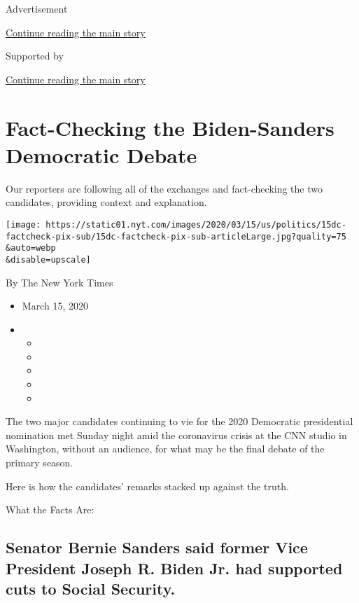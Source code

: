Advertisement

\protect\hyperlink{after-top}{Continue reading the main story}

Supported by

\protect\hyperlink{after-sponsor}{Continue reading the main story}

\hypertarget{fact-checking-the-biden-sanders-democratic-debate}{%
\section{Fact-Checking the Biden-Sanders Democratic
Debate}\label{fact-checking-the-biden-sanders-democratic-debate}}

Our reporters are following all of the exchanges and fact-checking the
two candidates, providing context and explanation.

\texttt{[image: https://static01.nyt.com/images/2020/03/15/us/politics/15dc-factcheck-pix-sub/15dc-factcheck-pix-sub-articleLarge.jpg?quality=75\\\&auto=webp\\\&disable=upscale]}

By The New York Times

\begin{itemize}
\item
  March 15, 2020
\item
  \begin{itemize}
  \item
  \item
  \item
  \item
  \item
  \end{itemize}
\end{itemize}

The two major candidates continuing to vie for the 2020 Democratic
presidential nomination met Sunday night amid the coronavirus crisis at
the CNN studio in Washington, without an audience, for what may be the
final debate of the primary season.

Here is how the candidates' remarks stacked up against the truth.

What the Facts Are:

\hypertarget{senator-bernie-sanders-said-former-vice-president-joseph-r-biden-jr-had-supported-cuts-to-social-security}{%
\subsection{Senator Bernie Sanders said former Vice President Joseph R.
Biden Jr. had supported cuts to Social
Security.}\label{senator-bernie-sanders-said-former-vice-president-joseph-r-biden-jr-had-supported-cuts-to-social-security}}


